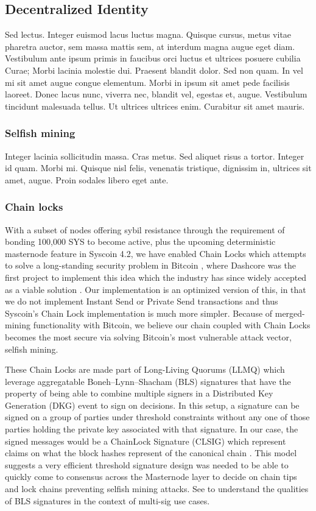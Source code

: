 \documentclass[peerreview]{ieeesyscoin}
\begin{document}
\subsection{Decentralized Identity}
Sed lectus. Integer euismod lacus luctus magna. Quisque cursus, metus vitae pharetra auctor, sem massa mattis sem, at interdum magna augue eget diam. Vestibulum ante ipsum primis in faucibus orci luctus et ultrices posuere cubilia Curae; Morbi lacinia molestie dui. Praesent blandit dolor. Sed non quam. In vel mi sit amet augue congue elementum. Morbi in ipsum sit amet pede facilisis laoreet. Donec lacus nunc, viverra nec, blandit vel, egestas et, augue. Vestibulum tincidunt malesuada tellus. Ut ultrices ultrices enim. Curabitur sit amet mauris. 

\subsubsection{Selfish mining}

Integer lacinia sollicitudin massa. Cras metus. Sed aliquet risus a tortor. Integer id quam. Morbi mi. Quisque nisl felis, venenatis tristique, dignissim in, ultrices sit amet, augue. Proin sodales libero eget ante.

\subsubsection{Chain locks}

With a subset of nodes offering sybil resistance through the requirement of bonding 100,000 SYS to become active, plus the upcoming deterministic masternode feature in Syscoin 4.2, we have enabled Chain Locks which attempts to solve a long-standing security problem in Bitcoin \cite{Eya18}, where Dashcore was the first project to implement this idea \cite{Blo18} which the industry has since widely accepted as a viable solution \cite{Val19}. Our implementation is an optimized version of this, in that we do not implement Instant Send or Private Send transactions and thus Syscoin’s Chain Lock implementation is much more simpler. Because of merged-mining functionality with Bitcoin, we believe our chain coupled with Chain Locks becomes the most secure via solving Bitcoin’s most vulnerable attack vector, selfish mining. 

These Chain Locks are made part of Long-Living Quorums (LLMQ) which leverage aggregatable Boneh–Lynn–Shacham (BLS) signatures that have the property of being able to combine multiple signers in a Distributed Key Generation (DKG) event to sign on decisions. In this setup, a signature can be signed on a group of parties under threshold constraints without any one of those parties holding the private key associated with that signature. In our case, the signed messages would be a ChainLock Signature (CLSIG) which represent claims on what the block hashes represent of the canonical chain \cite{Blo18}. This model suggests a very efficient   threshold signature design was needed to be able to quickly come to consensus across the Masternode layer to decide on chain tips and lock chains preventing selfish mining attacks. See \cite{Bon18} to understand the qualities of BLS signatures in the context of multi-sig use cases.
\end{document}
